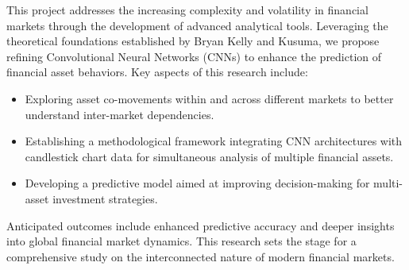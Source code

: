 
This project addresses the increasing complexity and volatility in financial markets through the development of advanced analytical tools. Leveraging the theoretical foundations established by Bryan Kelly and Kusuma, we propose refining Convolutional Neural Networks (CNNs) to enhance the prediction of financial asset behaviors. Key aspects of this research include:
\begin{itemize}
    \item Exploring asset co-movements within and across different markets to better understand inter-market dependencies.
    \item Establishing a methodological framework integrating CNN architectures with candlestick chart data for simultaneous analysis of multiple financial assets.
    \item Developing a predictive model aimed at improving decision-making for multi-asset investment strategies.
\end{itemize}
Anticipated outcomes include enhanced predictive accuracy and deeper insights into global financial market dynamics. This research sets the stage for a comprehensive study on the interconnected nature of modern financial markets.

